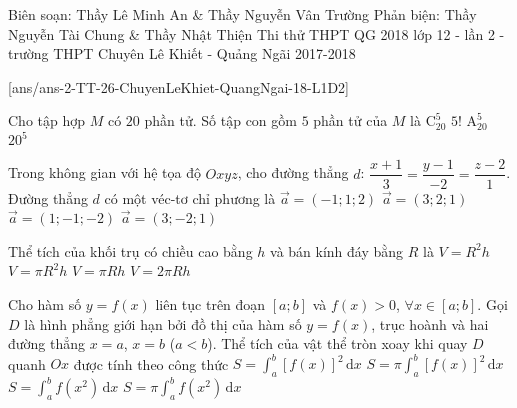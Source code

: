 \begin{name}
{Biên soạn: Thầy Lê Minh An \& Thầy Nguyễn Vân Trường
Phản biện: Thầy Nguyễn Tài Chung \& Thầy  Nhật Thiện}
{Thi thử THPT QG 2018 lớp 12 - lần 2 - trường THPT
Chuyên Lê Khiết - Quảng Ngãi 2017-2018}
\end{name}
\setcounter{ex}{0}\setcounter{bt}{0}
[ans/ans-2-TT-26-ChuyenLeKhiet-QuangNgai-18-L1D2]
\begin{ex}%
Cho tập hợp $M$ có $20$ phần tử. Số tập con gồm $5$ phần tử của $M$ là
\choice
{\True $\mathrm{C}_{20}^{5}$}
{$5!$}
{$\mathrm{A}_{20}^{5}$}
{$20^5$}
\end{ex}

\begin{ex}%
Trong không gian với hệ tọa độ $Oxyz$, cho đường thẳng $d$: $\dfrac{x+1}{3}=\dfrac{y-1}{-2}=\dfrac{z-2}{1}$. Đường thẳng $d$ có một véc-tơ chỉ phương là
\choice
{$\overrightarrow{a}=(-1;1;2)$}
{$\overrightarrow{a}=(3;2;1)$}
{$\overrightarrow{a}=(1;-1;-2)$}
{\True $\overrightarrow{a}=(3;-2;1)$}
\end{ex}

\begin{ex}%
Thể tích của khối trụ có chiều cao bằng $h$ và bán kính đáy bằng $R$ là 
\choice
{$V=R^2 h$}
{\True $V=\pi R^2 h$}
{$V=\pi R h$}
{$V=2\pi R h$}
\end{ex}

\begin{ex}%
Cho hàm số $y=f(x)$ liên tục trên đoạn $[a;b]$ và $f(x)>0$, $\forall x\in[a;b]$. Gọi $D$ là hình phẳng giới hạn bởi đồ thị của hàm số $y=f(x)$, trục hoành và hai đường thẳng $x=a$, $x=b$ ($a<b$). Thể tích của vật thể tròn xoay khi quay $D$ quanh $Ox$ được tính theo công thức
\choice
{$S=\displaystyle\int_a^b\left[f(x)\right]^2\mathrm{\, d}x$}
{\True $S=\pi\displaystyle\int_a^b\left[f(x)\right]^2\mathrm{\, d}x$}
{$S=\displaystyle\int_a^bf(x^2)\mathrm{\, d}x$}
{$S=\pi\displaystyle\int_a^bf(x^2)\mathrm{\, d}x$}
\end{ex}

